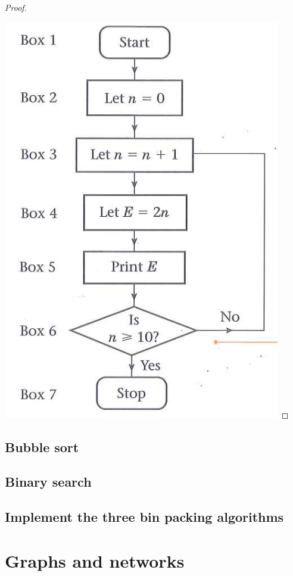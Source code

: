 \documentclass[a4paper]{article}
\begin{document}
\begin{eg}
\begin{proof}
\begin{enumerate}
\end{enumerate}
\includegraphics[scale=0.4]{img_D/1.png}
\end{proof}

\end{eg}

\subsection{Bubble sort}
\subsection{Binary search}
\subsection{Implement the three bin packing algorithms}

\section{Graphs and networks}
\end{document}

